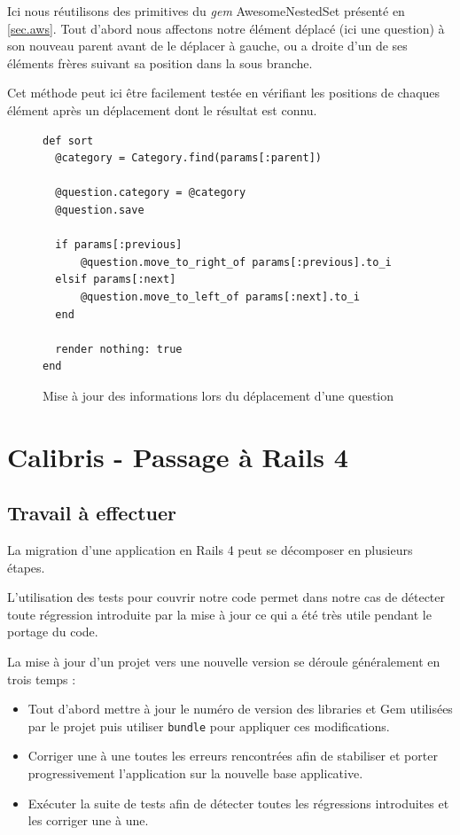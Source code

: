 \documentclass[12pt,a4paper]{book}
\begin{document}
Ici nous réutilisons des primitives du \textit{gem} AwesomeNestedSet présenté en \cref{sec.aws}. Tout d'abord nous affectons notre élément déplacé (ici une question) à son nouveau parent avant de le déplacer à gauche, ou a droite d'un de ses éléments frères suivant sa position dans la sous branche.

Cet méthode peut ici être facilement testée en vérifiant les positions de chaques élément après un déplacement dont le résultat est connu.

\begin{figure}[h]
\lstset{language=ruby}
\begin{lstlisting}
def sort
  @category = Category.find(params[:parent])

  @question.category = @category
  @question.save

  if params[:previous]
      @question.move_to_right_of params[:previous].to_i
  elsif params[:next]
      @question.move_to_left_of params[:next].to_i
  end

  render nothing: true
end
\end{lstlisting}
 \caption{Mise à jour des informations lors du déplacement d'une question}
 \label{fig.sort3}
\end{figure}

\section{Calibris - Passage à Rails 4} 

\label{section.rails4_dev}

\subsection{Travail à effectuer}

La migration d'une application en Rails 4 peut se décomposer en plusieurs étapes. 

L'utilisation des tests pour couvrir notre code permet dans notre cas de détecter toute régression introduite par la mise à jour ce qui a été très utile pendant le portage du code.

La mise à jour d'un projet vers une nouvelle version se déroule généralement en trois temps :
\begin{itemize}
  \item Tout d'abord mettre à jour le numéro de version des libraries et Gem utilisées par le projet puis utiliser \texttt{bundle} pour appliquer ces modifications.
  \item Corriger une à une toutes les erreurs rencontrées afin de stabiliser et porter progressivement l'application sur la nouvelle base applicative.
  \item Exécuter la suite de tests afin de détecter toutes les régressions introduites et les corriger une à une.
\end{itemize}
\end{document}
